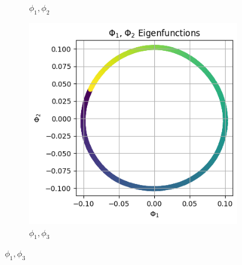 \begin{figure}[H]
\begin{subfigure}{.25\textwidth}
        \caption{$\phi_1, \phi_2$}
    \end{subfigure}%
    \begin{subfigure}{.25\textwidth}
        \includegraphics[width=\linewidth]{images/ex3_task2_part3_2D_3.png}
        \caption{$\phi_1, \phi_3$}
    \end{subfigure}
    

\end{figure}

